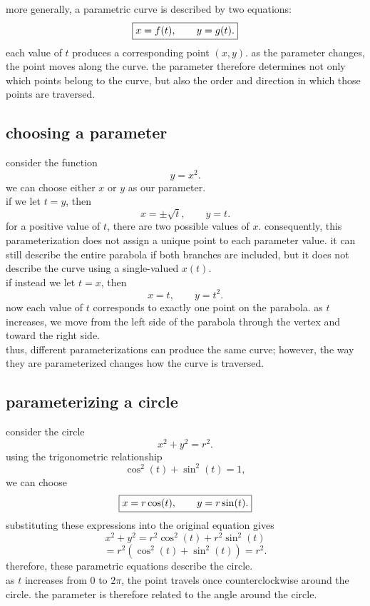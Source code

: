 \documentclass{article}
\newcommand{\mybox}[1]{\fbox{\ensuremath{\displaystyle #1}}}
\begin{document}
more generally, a parametric curve is described by two equations:
\[
\mybox{x=f(t),\qquad y=g(t).}
\]
each value of $t$ produces a corresponding point $(x,y)$. as the parameter changes, the point moves along the curve. the parameter therefore determines not only which points belong to the curve, but also the order and direction in which those points are traversed.\\

\subsection{choosing a parameter}

consider the function
\[
y=x^2.
\]
we can choose either $x$ or $y$ as our parameter.\\

if we let $t=y$, then
\[
x=\pm\sqrt{t},\qquad y=t.
\]
for a positive value of $t$, there are two possible values of $x$. consequently, this parameterization does not assign a unique point to each parameter value. it can still describe the entire parabola if both branches are included, but it does not describe the curve using a single-valued $x(t)$.\\

if instead we let $t=x$, then
\[
x=t,\qquad y=t^2.
\]
now each value of $t$ corresponds to exactly one point on the parabola. as $t$ increases, we move from the left side of the parabola through the vertex and toward the right side.\\

thus, different parameterizations can produce the same curve; however, the way they are parameterized changes how the curve is traversed.\\

\subsection{parameterizing a circle}

consider the circle
\[
x^2+y^2=r^2.
\]
using the trigonometric relationship
\[
\cos^2(t)+\sin^2(t)=1,
\]
we can choose
\[
\mybox{x=r\cos(t),\qquad y=r\sin(t).}
\]
substituting these expressions into the original equation gives
\[
x^2+y^2
=
r^2\cos^2(t)+r^2\sin^2(t)
\]
\[
=r^2\left(\cos^2(t)+\sin^2(t)\right)
=r^2.
\]
therefore, these parametric equations describe the circle.\\

as $t$ increases from $0$ to $2\pi$, the point travels once counterclockwise around the circle. the parameter is therefore related to the angle around the circle.\\
\end{document}
